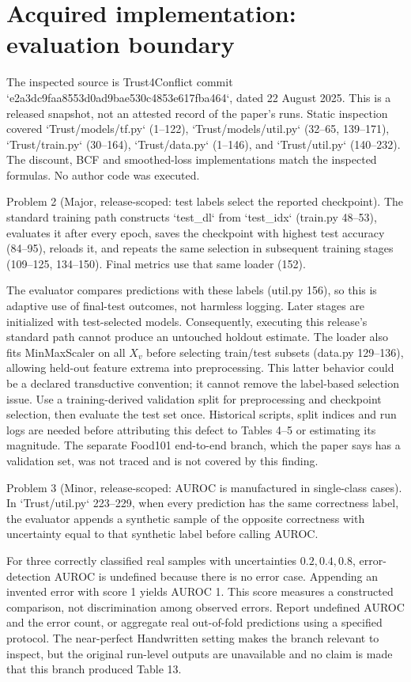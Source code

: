 \documentclass[10pt]{article}
\begin{document}
\section*{Acquired implementation: evaluation boundary}
The inspected source is Trust4Conflict commit `e2a3dc9faa8553d0ad9bae530c4853e617fba464`, dated 22 August 2025. This is a released snapshot, not an attested record of the paper’s runs. Static inspection covered `Trust/models/tf.py` (1–122), `Trust/models/util.py` (32–65, 139–171), `Trust/train.py` (30–164), `Trust/data.py` (1–146), and `Trust/util.py` (140–232). The discount, BCF and smoothed-loss implementations match the inspected formulas. No author code was executed.\par
Problem 2 (Major, release-scoped: test labels select the reported checkpoint).  The standard training path constructs `test\_dl` from `test\_idx` (train.py 48–53), evaluates it after every epoch, saves the checkpoint with highest test accuracy (84–95), reloads it, and repeats the same selection in subsequent training stages (109–125, 134–150). Final metrics use that same loader (152).\par
The evaluator compares predictions with these labels (util.py 156), so this is adaptive use of final-test outcomes, not harmless logging. Later stages are initialized with test-selected models. Consequently, executing this release’s standard path cannot produce an untouched holdout estimate. The loader also fits MinMaxScaler on all \(X_v\) before selecting train/test subsets (data.py 129–136), allowing held-out feature extrema into preprocessing. This latter behavior could be a declared transductive convention; it cannot remove the label-based selection issue. Use a training-derived validation split for preprocessing and checkpoint selection, then evaluate the test set once. Historical scripts, split indices and run logs are needed before attributing this defect to Tables 4–5 or estimating its magnitude. The separate Food101 end-to-end branch, which the paper says has a validation set, was not traced and is not covered by this finding.\par
Problem 3 (Minor, release-scoped: AUROC is manufactured in single-class cases).  In `Trust/util.py` 223–229, when every prediction has the same correctness label, the evaluator appends a synthetic sample of the opposite correctness with uncertainty equal to that synthetic label before calling AUROC.\par
For three correctly classified real samples with uncertainties \(0.2,0.4,0.8\), error-detection AUROC is undefined because there is no error case. Appending an invented error with score 1 yields AUROC 1. This score measures a constructed comparison, not discrimination among observed errors. Report undefined AUROC and the error count, or aggregate real out-of-fold predictions using a specified protocol. The near-perfect Handwritten setting makes the branch relevant to inspect, but the original run-level outputs are unavailable and no claim is made that this branch produced Table 13.\par
\end{document}
